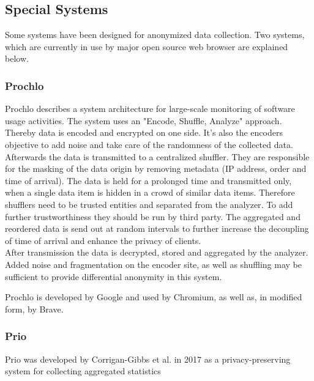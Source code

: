     \subsection{Special Systems}
        \label{subsec:related:special}
        Some systems have been designed for anonymized data collection. 
        Two systems, which are currently in use by major open source web browser are explained below.
         
        
    \subsubsection{Prochlo}
        Prochlo describes a system architecture for large-scale monitoring of software usage activities. The system uses an "Encode, Shuffle, Analyze" approach. Thereby data is encoded and encrypted on one side. It's also the encoders objective to add noise and take care of the randomness of the collected data\cite{bittau_prochlo_2017}.\\
        Afterwards the data is transmitted to a centralized shuffler. They are responsible for the masking of the data origin by removing metadata (IP address, order and time of arrival).
        The data is held for a prolonged time and transmitted only, when a single data item is hidden in a crowd of similar data items. Therefore shufflers need to be trusted entities and separated from the analyzer\cite{bittau_prochlo_2017}. To add further trustworthiness they should be run by third party. The aggregated and reordered data is send out at random intervals to further increase the decoupling of time of arrival and enhance the privacy of clients.\\
        After transmission the data is decrypted, stored and aggregated by the analyzer. 
        Added noise and fragmentation on the encoder site, as well as shuffling may be sufficient to provide differential anonymity in this system.
        
        Prochlo is developed by Google and used by Chromium, as well as, in modified form, by Brave.
    
    \subsubsection{Prio}
        Prio was developed by Corrigan-Gibbs et al.\cite{corrigan-gibbs_prio_2017} in 2017 as a privacy-preserving
        system for collecting aggregated statistics
        
